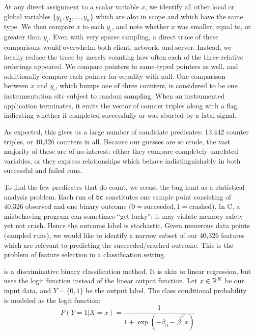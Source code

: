 At any direct assignment to a scalar variable $x$, we identify all
other local or global variables $\{ y_1, y_2, \dots, y_n \}$ which are
also in scope and which have the same type.  We then compare $x$ to
each $y_i$, and note whether $x$ was smaller, equal to, or greater
than $y_i$.  Even with very sparse sampling, a direct trace of these
comparisons would overwhelm both client, network, and server.
Instead, we locally reduce the trace by merely counting how often each
of the three relative orderings appeared.  We compare pointers to
same-typed pointers as well, and additionally compare each pointer for
equality with null.  One comparison between $x$ and $y_i$, which bumps
one of three counters, is considered to be one instrumentation site
subject to random sampling.  When an instrumented application
terminates, it emits the vector of counter triples along with a flag
indicating whether it completed successfully or was aborted by a fatal
signal.

As expected, this gives us a large number of candidate predicates:
13,442 counter triples, or 40,326 counters in all.  Because our
guesses are so crude, the vast majority of these are of no interest:
either they compare completely unrelated variables, or they express
relationships which behave indistinguishably in both successful and
failed runs.

To find the few predicates that do count, we recast the bug hunt as a
statistical analysis problem.  Each run of \texttt{bc} constitutes one
sample point consisting of 40,326 observed  and one
binary outcome ($0 = \text{succeeded}, 1 = \text{crashed}$).  In C, a
misbehaving program can sometimes ``get lucky'': it may violate memory
safety yet not crash.  Hence the outcome label is stochastic.  Given
numerous data points (sampled runs), we would like to identify a
narrow subset of our 40,326 features which are relevant to predicting
the succeeded/crashed outcome.  This is the problem of feature
selection in a classification setting.

 \cite{Hastie01} is a discriminative
binary classification method.  It is akin to linear regression, but
uses the logit function instead of the linear output function.  Let $x
\in \mathbb{R}^N$ be our input data, and $Y = \{0, 1\}$ be the output
label.  The class conditional probability is modeled as the logit
function:
\begin{equation*}
  P(Y = 1 | X = x) = \frac{1}{ 1 + \exp(- \beta_0 - \vec\beta^T x) }
\end{equation*}

